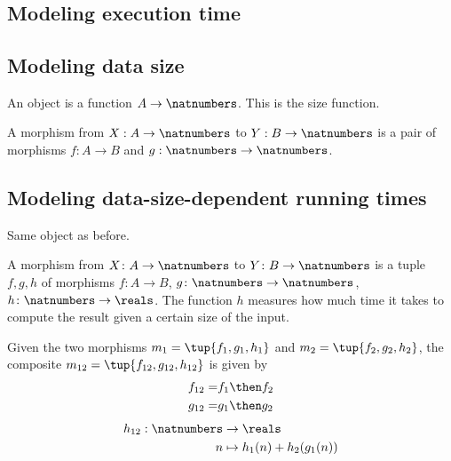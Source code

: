 

\section{}



\subsection{Modeling execution time}


\subsection{Modeling data size}

An object is a function $A \to \natnumbers $. This is the size function.


A morphism from $X: A \to \natnumbers $ to $Y: B \to \natnumbers$ is a pair of morphisms
$f: A \to B$ and $g: \natnumbers \to \natnumbers$.


\subsection{Modeling data-size-dependent running times}

Same object as before.


A morphism from $X\colon A \to \natnumbers $ to $Y\colon B \to \natnumbers$ is a tuple $f, g, h$ of morphisms
$f\colon A \to B$, $g\colon \natnumbers \to \natnumbers$, $h\colon \natnumbers \to \reals$. The function $h$ measures
how much time it takes to compute the result given a certain size of the input.

Given the two morphisms $m_1 = \tup{f_1, g_1, h_1}$ and $m_2 = \tup{f_2, g_2, h_2}$, the composite
$m_{12} = \tup{f_{12}, g_{12}, h_{12}}$ is given by
%
\begin{eqnarray}
  f_{12} =& f_1 \then f_2 \\
  g_{12} =& g_1 \then g_2 \\
\end{eqnarray}
%
\begin{eqnarray}
  h_{12} : \natnumbers & \to \reals \\
  n & \mapsto h_1(n) + h_2( g_1 (n))
\end{eqnarray}
